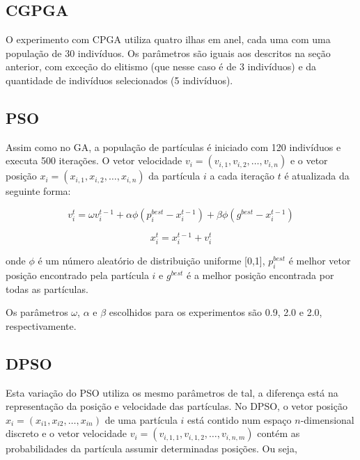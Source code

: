\subsection{CGPGA}

O experimento com CPGA utiliza quatro ilhas em anel, cada uma com uma população de 30 indivíduos. Os parâmetros são iguais aos descritos na seção anterior, com exceção do elitismo (que nesse caso é de 3 indivíduos) e da quantidade de indivíduos selecionados (5 indivíduos).

\subsection{PSO}

Assim como no GA, a população de partículas é iniciado com 120 indivíduos e executa 500 iterações. O vetor velocidade $v_{i} = (v_{i,1}, v_{i,2}, \dots, v_{i,n})$ e o vetor posição $x_{i} = (x_{i,1}, x_{i,2}, \dots, x_{i,n})$ da partícula $i$ a cada iteração $t$ é atualizada da seguinte forma:

\begin{equation}
v_{i}^{t} = \omega v_{i}^{t-1} + \alpha \phi (p_{i}^{best} - x_{i}^{t-1}) + \beta \phi (g^{best} - x_{i}^{t-1})
\end{equation}

\begin{equation}
x_{i}^{t} = x_{i}^{t-1} + v_{i}^{t}
\end{equation}

onde $\phi$ é um número aleatório de distribuição uniforme [0,1], $p_{i}^{best}$ é melhor vetor posição encontrado pela partícula $i$ e $g^{best}$ é a melhor posição encontrada por todas as partículas.

Os parâmetros $\omega$, $\alpha$ e $\beta$ escolhidos para os experimentos são 0.9, 2.0 e 2.0, respectivamente.

\subsection{DPSO}

Esta variação do PSO utiliza os mesmo parâmetros de tal, a diferença está na representação da posição e velocidade das partículas. No DPSO, o vetor posição $x_{i} = (x_{i1}, x_{i2}, \dots, x_{in})$ de uma partícula $i$ está contido num espaço $n$-dimensional discreto e o vetor velocidade $v_{i} = (v_{i,1,1}, v_{i,1,2}, \dots, v_{i,n,m})$ contém as probabilidades da partícula assumir determinadas posições. Ou seja,

